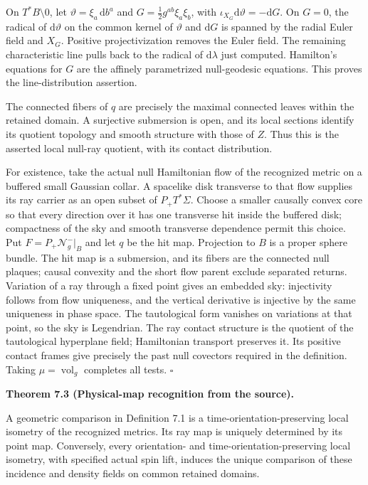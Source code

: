 \documentclass[
  english,
  11pt,
  reqno]{amsart}
\makeatletter
\newcommand{\pandocstatementheading}[1]{%
  \par\if@nobreak\else
    \addpenalty{\@beginparpenalty}%
    \addvspace{.5\baselineskip plus .2\baselineskip minus .2\baselineskip}%
  \fi
  {\normalfont\bfseries #1\par}%
  \nobreak\@afterindenttrue\@afterheading
}
\makeatother
\begin{document}
On \(T^*B\setminus0\), let \(\vartheta=\xi_a\,\mathrm db^a\) and
\(G=\tfrac12g^{ab}\xi_a\xi_b\), with
\(\iota_{X_G}\mathrm d\vartheta=-\mathrm dG\). On \(G=0\), the radical
of \(\mathrm d\vartheta\) on the common kernel of \(\vartheta\) and
\(\mathrm dG\) is spanned by the radial Euler field and \(X_G\).
Positive projectivization removes the Euler field. The remaining
characteristic line pulls back to the radical of \(\mathrm d\lambda\)
just computed. Hamilton's equations for \(G\) are the affinely
parametrized null-geodesic equations. This proves the line-distribution
assertion.

The connected fibers of \(q\) are precisely the maximal connected leaves
within the retained domain. A surjective submersion is open, and its
local sections identify its quotient topology and smooth structure with
those of \(Z\). Thus this is the asserted local null-ray quotient, with
its contact distribution.

For existence, take the actual null Hamiltonian flow of the recognized
metric on a buffered small Gaussian collar. A spacelike disk transverse
to that flow supplies its ray carrier as an open subset of
\(P_+T^*\Sigma\). Choose a smaller causally convex core so that every
direction over it has one transverse hit inside the buffered disk;
compactness of the sky and smooth transverse dependence permit this
choice. Put \(F=P_+\mathcal N_g^-|_B\) and let \(q\) be the hit map.
Projection to \(B\) is a proper sphere bundle. The hit map is a
submersion, and its fibers are the connected null plaques; causal
convexity and the short flow parent exclude separated returns. Variation
of a ray through a fixed point gives an embedded sky: injectivity
follows from flow uniqueness, and the vertical derivative is injective
by the same uniqueness in phase space. The tautological form vanishes on
variations at that point, so the sky is Legendrian. The ray contact
structure is the quotient of the tautological hyperplane field;
Hamiltonian transport preserves it. Its positive contact frames give
precisely the past null covectors required in the definition. Taking
\(\mu=\operatorname{vol}_g\) completes all tests. \hfill\(\square\)

\pandocstatementheading{\leavevmode{}\label{thm:online-incidence-physical-recognition}Theorem 7.3 (Physical-map recognition from the source).}

A geometric comparison in Definition 7.1 is a
time-orientation-preserving local isometry of the recognized metrics.
Its ray map is uniquely determined by its point map. Conversely, every
orientation- and time-orientation-preserving local isometry, with
specified actual spin lift, induces the unique comparison of these
incidence and density fields on common retained domains.
\end{document}

